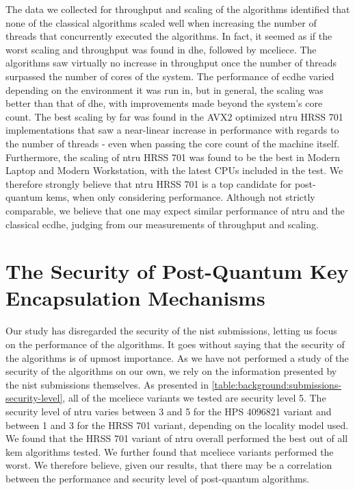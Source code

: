 The data we collected for throughput and scaling of the algorithms identified that none of the classical algorithms scaled well when increasing the number of threads that concurrently executed the algorithms. In fact, it seemed as if the worst scaling and throughput was found in \gls{dhe}, followed by \gls{mceliece}. The algorithms saw virtually no increase in throughput once the number of threads surpassed the number of cores of the system. The performance of \gls{ecdhe} varied depending on the environment it was run in, but in general, the scaling was better than that of \gls{dhe}, with improvements made beyond the system's core count. The best scaling by far was found in the AVX2 optimized \gls{ntru} HRSS 701 implementations that saw a near-linear increase in performance with regards to the number of threads - even when passing the core count of the machine itself. Furthermore, the scaling of \gls{ntru} HRSS 701 was found to be the best in Modern Laptop and Modern Workstation, with the latest CPUs included in the test. We therefore strongly believe that \gls{ntru} HRSS 701 is a top candidate for \gls{post-quantum} \glspl{kem}, when only considering performance. Although not strictly comparable, we believe that one may expect similar performance of \gls{ntru} and the classical \gls{ecdhe}, judging from our measurements of throughput and scaling.


\section{The Security of Post-Quantum Key Encapsulation Mechanisms}

Our study has disregarded the security of the \gls{nist} submissions, letting us focus on the performance of the algorithms. It goes without saying that the security of the algorithms is of upmost importance. As we have not performed a study of the security of the algorithms on our own, we rely on the information presented by the \gls{nist} submissions themselves. As presented in \ref{table:background:submissions-security-level}, all of the \gls{mceliece} variants we tested are security level 5. The security level of \gls{ntru} varies between 3 and 5 for the HPS 4096821 variant and between 1 and 3 for the HRSS 701 variant, depending on the locality model used. We found that the HRSS 701 variant of \gls{ntru} overall performed the best out of all \gls{kem} algorithms tested. We further found that \gls{mceliece} variants performed the worst. We therefore believe, given our results, that there may be a correlation between the performance and security level of \gls{post-quantum} algorithms.

